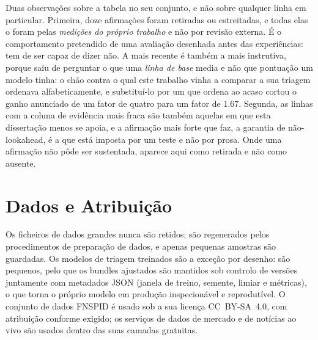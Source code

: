 Duas observações sobre a tabela no seu conjunto, e não sobre qualquer linha em particular. Primeira,
doze afirmações foram retiradas ou estreitadas, e todas elas o foram pelas \emph{medições do
próprio trabalho} e não por revisão externa. É o comportamento pretendido de uma avaliação desenhada
antes das experiências: tem de ser capaz de dizer não. A mais recente é também a mais instrutiva,
porque saiu de perguntar o que uma \emph{linha de base} media e não que pontuação um modelo tinha: o
chão contra o qual este trabalho vinha a comparar a sua triagem ordenava alfabeticamente, e substituí-lo
por um que ordena ao acaso cortou o ganho anunciado de um fator de quatro para um fator de $1.67$.
Segunda, as linhas com a coluna de evidência
mais fraca são também aquelas em que esta dissertação menos se apoia, e a afirmação mais forte que faz,
a garantia de não-lookahead, é a que está imposta por um teste e não por prosa. Onde uma afirmação não
pôde ser sustentada, aparece aqui como retirada e não como ausente.

\section{Dados e Atribuição}
\label{app:repro_data}

Os ficheiros de dados grandes nunca são retidos; são regenerados pelos procedimentos de preparação de
dados, e apenas pequenas amostras são guardadas. Os modelos de triagem treinados são a exceção por desenho: são pequenos,
pelo que os bundles ajustados são mantidos sob controlo de versões juntamente com metadados JSON (janela de
treino, semente, limiar e métricas), o que torna o próprio modelo em produção inspecionável e reprodutível.
O conjunto de dados FNSPID \autocite{dong2024fnspid} é usado sob a sua licença CC~BY-SA~4.0, com atribuição
conforme exigido; os serviços de dados de mercado e de notícias ao vivo são usados dentro das suas camadas
gratuitas.
